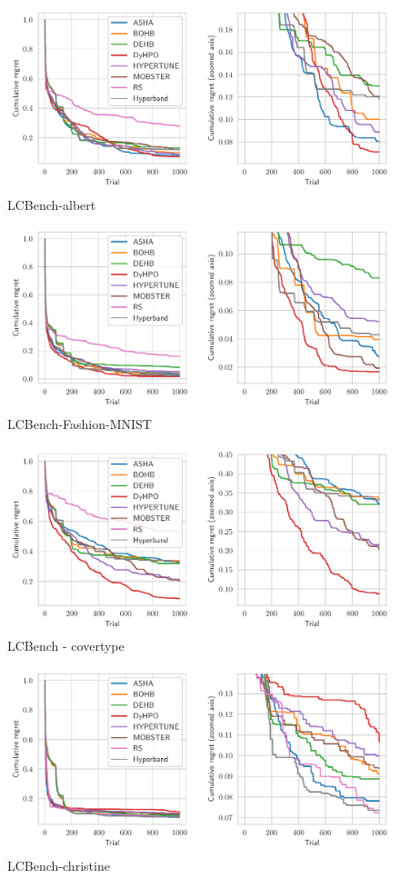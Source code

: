 \begin{figure}[H]
    \centering
    \includegraphics[scale=0.58]{img/tabular_exp/lcbench-albert_plot.pdf}
    \caption{LCBench-albert}
\end{figure}

\begin{figure}[H]
    \centering
    \includegraphics[scale=0.58]{img/tabular_exp/lcbench-Fashion-MNIST_plot.pdf}
    \caption{LCBench-Fashion-MNIST}
\end{figure}

\begin{figure}[H]
    \centering
    \includegraphics[scale=0.58]{img/tabular_exp/lcbench-covertype_plot.pdf}
    \caption{LCBench - covertype}
\end{figure}

\begin{figure}[H]
    \centering
    \includegraphics[scale=0.58]{img/tabular_exp/lcbench-christine_plot.pdf}
    \caption{LCBench-christine}
\end{figure}
